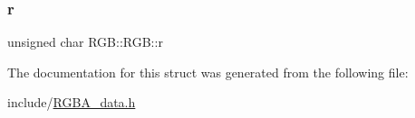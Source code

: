 \subsubsection{\texorpdfstring{r}{r}}
{\footnotesize\ttfamily unsigned char R\+G\+B\+::\+R\+G\+B\+::r}



The documentation for this struct was generated from the following file\+:\begin{DoxyCompactItemize}
\item 
include/\mbox{\hyperlink{_r_g_b_a__data_8h}{R\+G\+B\+A\+\_\+data.\+h}}\end{DoxyCompactItemize}
